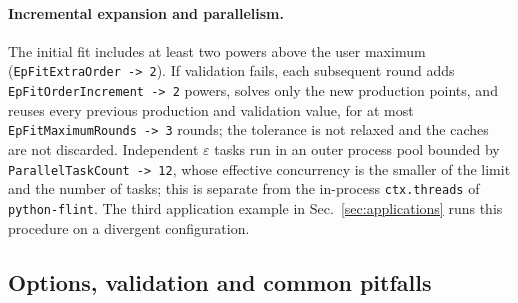 \documentclass[11pt,a4paper]{article}
\numberwithin{table}{section}
\begin{document}
\paragraph{Incremental expansion and parallelism.}
The initial fit includes at least two powers above the user maximum
(\texttt{EpFitExtraOrder -> 2}). If validation fails, each subsequent round adds
\texttt{EpFitOrderIncrement -> 2} powers, solves only the new production points, and reuses
every previous production and validation value, for at most \texttt{EpFitMaximumRounds -> 3}
rounds; the tolerance is not relaxed and the caches are not discarded. Independent
$\varepsilon$ tasks run in an outer process pool bounded by \texttt{ParallelTaskCount -> 12},
whose effective concurrency is the smaller of the limit and the number of tasks; this is
separate from the in-process \texttt{ctx.threads} of \texttt{python-flint}.
The third application example in Sec.~\ref{sec:applications} runs this procedure on a divergent
configuration.

\subsection{Options, validation and common pitfalls}
\label{sec:options}
\end{document}
